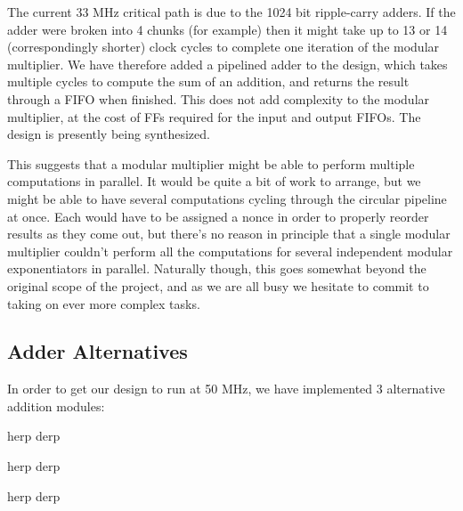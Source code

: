 \documentclass[12pt]{article}
\begin{document}
The current 33 MHz critical path is due to the 1024 bit ripple-carry adders. If the adder were broken 
into 4 chunks (for example) then it might take up to 13 or 14 (correspondingly shorter) clock cycles to complete 
one iteration of the modular multiplier. We have therefore added a pipelined adder to the design, which takes multiple
cycles to compute the sum of an addition, and returns the result through a FIFO when finished. This does not
add complexity to the modular multiplier, at the cost of FFs required for the input and output FIFOs. The
design is presently being synthesized. 

This suggests that a modular multiplier might be able to perform multiple computations in parallel.
It would be quite a bit of work to arrange,
but we might be able to have several computations cycling through the circular pipeline at once.
Each would have to be assigned a nonce in order to properly reorder results as they come out,
but there's no reason in principle that a single modular multiplier couldn't perform all the computations
for several independent modular exponentiators in parallel.
Naturally though, this goes somewhat beyond the original scope of the project,
and as we are all busy we hesitate to commit to taking on ever more complex tasks.
\subsection{Adder Alternatives}
In order to get our design to run at 50 MHz, we have implemented 3 alternative addition modules:

herp derp

herp derp

herp derp
\end{document}
